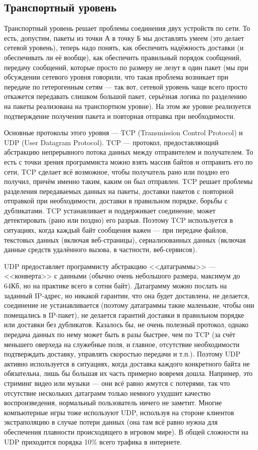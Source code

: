 \documentclass{../../text-style}
\begin{document}
\subsection{Транспортный уровень}

Транспортный уровень решает проблемы соединения двух устройств по сети. То есть, допустим, пакеты из точки А в точку Б мы доставлять умеем (это делает сетевой уровень), теперь надо понять, как обеспечить надёжность доставки (и обеспечивать ли её вообще), как обеспечить правильный порядок сообщений, передачу сообщений, которые просто по размеру не лезут в один пакет (мы при обсуждении сетевого уровня говорили, что такая проблема возникает при передаче по гетерогенным сетям --- так вот, сетевой уровень чаще всего просто откажется передавать слишком большой пакет, серьёзная логика по разделению на пакеты реализована на транспортном уровне). На этом же уровне реализуется подтверждение получения пакета и повторная отправка при необходимости.

Основные протоколы этого уровня --- TCP (Transmission Control Protocol) и UDP (User Datagram Protocol). TCP --- протокол, предоставляющий абстракцию непрерывного потока данных между отправителем и получателем. То есть с точки зрения программиста можно взять массив байтов и отправить его по сети, TCP сделает всё возможное, чтобы получатель рано или поздно его получил, причём именно таким, каким он был отправлен. TCP решает проблемы разделения передаваемых данных на пакеты, доставки пакетов с повторной отправкой при необходимости, доставки в правильном порядке, борьбы с дубликатами. TCP устанавливает и поддерживает соединение, может детектировать (рано или поздно) его разрыв. Поэтому TCP используется в ситуациях, когда каждый байт сообщения важен --- при передаче файлов, текстовых данных (включая веб-страницы), сериализованных данных (включая данные средств удалённого вызова, в частности, веб-сервисов).

UDP предоставляет программисту абстракцию <<датаграммы>> --- <<конверта>> с данными (обычно очень небольшого размера, максимум до 64Кб, но на практике всего в сотни байт). Датаграмму можно послать на заданный IP-адрес, но никакой гарантии, что она будет доставлена, не делается, соединение не устанавливается (поэтому датаграммы такие маленькие, чтобы они помещались в IP-пакет), не делается гарантий доставки в правильном порядке или доставки без дубликатов. Казалось бы, не очень полезный протокол, однако передача данных по нему может быть в разы быстрее, чем по TCP (за счёт меньшего оверхеда на служебные поля, и главное, отсутствие необходимости подтверждать доставку, управлять скоростью передачи и т.п.). Поэтому UDP активно используется в ситуациях, когда доставка каждого конкретного байта не обязательна, лишь бы большая их часть примерно вовремя дошла. Например, это стриминг видео или музыки --- они всё равно жмутся с потерями, так что отсутствие нескольких датаграмм только немного ухудшит качество воспроизведения, нормальный пользователь ничего не заметит. Многие компьютерные игры тоже используют UDP, используя на стороне клиентов экстраполяцию в случае потери данных (она там всё равно нужна для обеспечения плавности происходящего в игровом мире). В общей сложности на UDP приходится порядка 10\% всего трафика в интернете.
\end{document}
